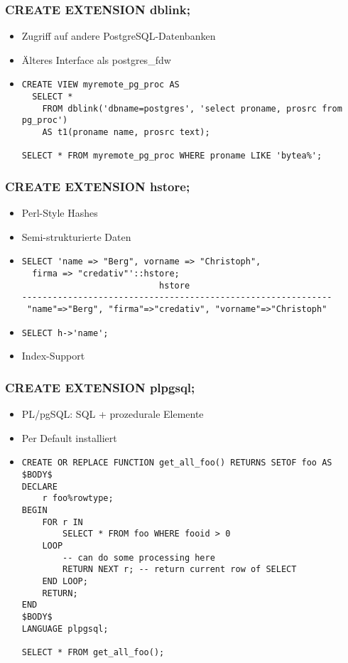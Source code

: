\documentclass[utf8,hyperref={pdftex,colorlinks,linkcolor=black,citecolor=black,urlcolor=black,filecolor=black,plainpages=false},xcolor=table,hyperref]{beamer}
\begin{document}
\begin{frame}[containsverbatim]
	\frametitle{CREATE EXTENSION dblink;}
	\begin{itemize}
		\item Zugriff auf andere PostgreSQL-Datenbanken
		\item Älteres Interface als postgres_fdw
		\item \begin{verbatim}
CREATE VIEW myremote_pg_proc AS
  SELECT *
    FROM dblink('dbname=postgres', 'select proname, prosrc from pg_proc')
    AS t1(proname name, prosrc text);

SELECT * FROM myremote_pg_proc WHERE proname LIKE 'bytea%';
\end{verbatim}
\end{itemize}
\end{frame}

\begin{frame}[containsverbatim]
	\frametitle{CREATE EXTENSION hstore;}
	\begin{itemize}
		\item Perl-Style Hashes
		\item Semi-strukturierte Daten
		\item \begin{verbatim}
SELECT 'name => "Berg", vorname => "Christoph",
  firma => "credativ"'::hstore;
                           hstore                            
-------------------------------------------------------------
 "name"=>"Berg", "firma"=>"credativ", "vorname"=>"Christoph"
 \end{verbatim}
 \item \verb|SELECT h->'name';|
 \item Index-Support
 \end{itemize}
\end{frame}

\begin{frame}[containsverbatim]
	\frametitle{CREATE EXTENSION plpgsql;}
	\begin{itemize}
		\item PL/pgSQL: SQL + prozedurale Elemente
		\item Per Default installiert
		\item \small
			\begin{verbatim}
CREATE OR REPLACE FUNCTION get_all_foo() RETURNS SETOF foo AS
$BODY$
DECLARE
    r foo%rowtype;
BEGIN
    FOR r IN
        SELECT * FROM foo WHERE fooid > 0
    LOOP
        -- can do some processing here
        RETURN NEXT r; -- return current row of SELECT
    END LOOP;
    RETURN;
END
$BODY$
LANGUAGE plpgsql;

SELECT * FROM get_all_foo();
\end{verbatim}
	\end{itemize}
\end{frame}
\end{document}
